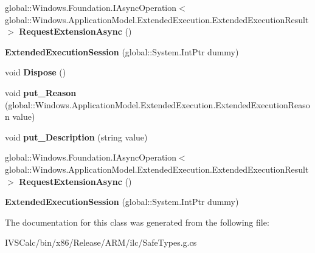 \begin{DoxyCompactItemize}
global\+::\+Windows.\+Foundation.\+I\+Async\+Operation$<$ global\+::\+Windows.\+Application\+Model.\+Extended\+Execution.\+Extended\+Execution\+Result $>$ {\bfseries Request\+Extension\+Async} ()
\item 
\mbox{\label{class_windows_1_1_application_model_1_1_extended_execution_1_1_extended_execution_session_a46bcb431911d1811af8851af151075c4}} 
{\bfseries Extended\+Execution\+Session} (global\+::\+System.\+Int\+Ptr dummy)
\item 
\mbox{\label{class_windows_1_1_application_model_1_1_extended_execution_1_1_extended_execution_session_a9a9b5dca28960f42d43054fca55a63f0}} 
void {\bfseries Dispose} ()
\item 
\mbox{\label{class_windows_1_1_application_model_1_1_extended_execution_1_1_extended_execution_session_aa358d0b0e3c44d87b444499323cd693e}} 
void {\bfseries put\+\_\+\+Reason} (global\+::\+Windows.\+Application\+Model.\+Extended\+Execution.\+Extended\+Execution\+Reason value)
\item 
\mbox{\label{class_windows_1_1_application_model_1_1_extended_execution_1_1_extended_execution_session_af499c01b24316417ab837241cbc579f3}} 
void {\bfseries put\+\_\+\+Description} (string value)
\item 
\mbox{\label{class_windows_1_1_application_model_1_1_extended_execution_1_1_extended_execution_session_adc9b60c4fdd1c687858d54fff5085a7e}} 
global\+::\+Windows.\+Foundation.\+I\+Async\+Operation$<$ global\+::\+Windows.\+Application\+Model.\+Extended\+Execution.\+Extended\+Execution\+Result $>$ {\bfseries Request\+Extension\+Async} ()
\item 
\mbox{\label{class_windows_1_1_application_model_1_1_extended_execution_1_1_extended_execution_session_a46bcb431911d1811af8851af151075c4}} 
{\bfseries Extended\+Execution\+Session} (global\+::\+System.\+Int\+Ptr dummy)
\end{DoxyCompactItemize}


The documentation for this class was generated from the following file\+:\begin{DoxyCompactItemize}
\item 
I\+V\+S\+Calc/bin/x86/\+Release/\+A\+R\+M/ilc/Safe\+Types.\+g.\+cs\end{DoxyCompactItemize}
